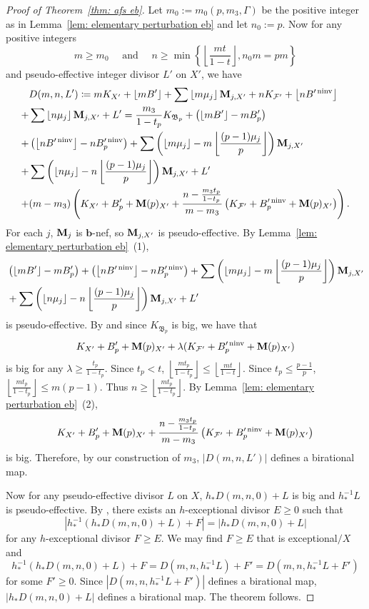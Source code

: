 \documentclass[11pt,reqno]{amsart}
\numberwithin{equation}{section}
\newcommand{\bb}{\bm{b}}
\newcommand{\Mm}{{\bf{M}}}
\newcommand{\ninv}{\operatorname{ninv}}
\newcommand{\Bb}{{\mathfrak{B}}}
\newcommand{\Ff}{\mathcal{F}}
\newcommand{\Ii}{\Gamma}
\theoremstyle{definition}
\begin{document}
\begin{proof}[Proof of Theorem~\ref{thm: afs eb}]
Let $m_0:=m_0(p,m_3,\Ii)$ be the positive integer as in Lemma~\ref{lem: elementary perturbation eb} and let $n_0:=p$. Now for any positive integers 
$$m\geq m_0 \quad \text{ and }\quad n\geq\min\left\{\left\lfloor\frac{mt}{1-t}\right\rfloor,n_0m=pm\right\}$$ 
and pseudo-effective integer divisor $L'$ on $X'$, we have
\begin{align*}
&D(m,n,L')
\coloneqq 
mK_{X'}+\left\lfloor mB'\right\rfloor+\sum\left\lfloor m\mu_j\right\rfloor\Mm_{j,X'}+nK_{\Ff'}+\left\lfloor nB'^{\ninv}\right\rfloor\\
+&\sum\left\lfloor n\mu_j\right\rfloor\Mm_{j,X'}+L'
=\frac{m_3}{1-t_p}K_{\Bb_p}+\left(\left\lfloor mB'\right\rfloor-mB_p'\right)\\
+&\left(\left\lfloor nB'^{\ninv}\right\rfloor-nB_p'^{\ninv}\right)
+\sum\left(\left\lfloor m\mu_j\right\rfloor-m\left\lfloor\frac{(p-1)\mu_j}{p}\right\rfloor\right)\Mm_{j,X'}\\
+&\sum\left(\left\lfloor n\mu_j\right\rfloor-n\left\lfloor\frac{(p-1)\mu_j}{p}\right\rfloor\right)\Mm_{j,X'}+L'\\
+&(m-m_3)\left(K_{X'}+B_p'+\Mm(p)_{X'}+\frac{n-\frac{m_3t_p}{1-t_p}}{m-m_3}\left(K_{\Ff'}+B_p'^{\ninv}+\Mm(p)_{X'}\right)\right).
\end{align*}
For each $j$, $\Mm_j$ is $\bb$-nef, so $\Mm_{j,X'}$ is pseudo-effective. By Lemma~\ref{lem: elementary perturbation eb}~(1), \begin{align*}
        &\left(\left\lfloor mB'\right\rfloor-mB'_p\right)+\left(\left\lfloor nB'^{\ninv}\right\rfloor-nB_p'^{\ninv}\right)+\sum\left(\lfloor m\mu_j\rfloor-m\left\lfloor\frac{(p-1)\mu_j}{p}\right\rfloor\right)\Mm_{j,X'}\\
&+\sum\left(\lfloor n\mu_j\rfloor-n\left\lfloor\frac{(p-1)\mu_j}{p}\right\rfloor\right)\Mm_{j,X'}+L'
    \end{align*}
    is pseudo-effective. By \cite[Theorem~5.1]{Cas+25a} and since $K_{\Bb_p}$ is big, we have that 
$$K_{X'}+B_p'+\Mm(p)_{X'}+\lambda(K_{\Ff'}+B_p'^{\ninv}+\Mm(p)_{X'})$$
    is big for any $\lambda\geq\frac{t_p}{1-t_p}$. Since $t_p<t$, $\left\lfloor\frac{mt_p}{1-t_p}\right\rfloor\leq\left\lfloor\frac{mt}{1-t}\right\rfloor$. Since $t_p\leq\frac{p-1}{p}$, $\left\lfloor\frac{mt_p}{1-t_p}\right\rfloor\leq m(p-1)$. Thus $n\geq\left\lfloor\frac{mt_p}{1-t_p}\right\rfloor$. By Lemma~\ref{lem: elementary perturbation eb}~(2), 
$$K_{X'}+B_p'+\Mm(p)_{X'}+\frac{n-\frac{m_3t_p}{1-t_p}}{m-m_3}\left(K_{\Ff'}+B_p'^{\ninv}+\Mm(p)_{X'}\right)$$
is big. Therefore, by our construction of $m_3$, $|D(m,n,L')|$ defines a birational map.

Now for any pseudo-effective divisor $L$ on $X$, $h_*D(m,n,0)+L$ is big and $h^{-1}_*L$ is pseudo-effective. By \cite[III. 5.10 Lemma]{Nak04}, there exists an $h$-exceptional divisor $E\geq 0$ such that
$$|h^{-1}_*(h_*D(m,n,0)+L)+F|=|h_*D(m,n,0)+L|$$
for any $h$-exceptional divisor $F\geq E$. We may find $F\geq E$ that is exceptional$/X$ and
$$h^{-1}_*(h_*D(m,n,0)+L)+F=D(m,n,h^{-1}_*L)+F'=D(m,n,h^{-1}_*L+F')$$
for some $F'\geq 0$. Since $|D(m,n,h^{-1}_*L+F')|$ defines a birational map, $|h_*D(m,n,0)+L|$ defines a birational map. The theorem follows.
\end{proof}
\end{document}
